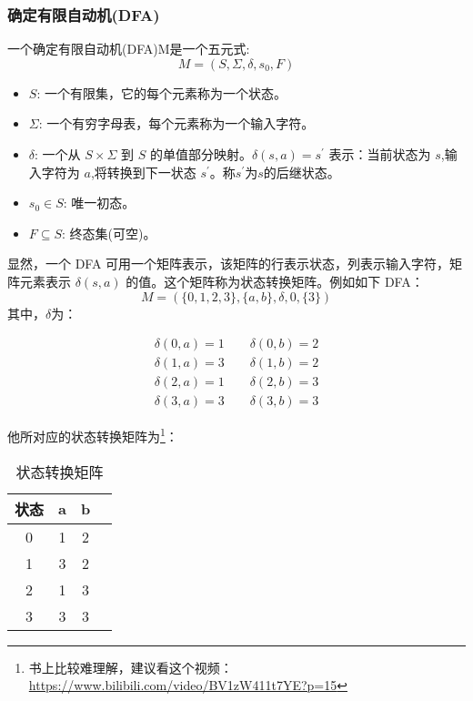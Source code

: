 \subsubsection{\textcolor{imp}{确定有限自动机(DFA)}}

一个确定有限自动机(DFA)M是一个五元式:
\[ M = (S,\Sigma,\delta,s_0,F) \]

\begin{itemize}
    \item $S$: 一个有限集，它的每个元素称为一个状态。
    \item $\Sigma$: 一个有穷字母表，每个元素称为一个输入字符。
    \item $\delta$: 一个从 $S \times \Sigma$ 到 $S$ 的单值部分映射。$\delta(s,a)=s^{'}$ 表示：当前状态为 $s$,输入字符为 $a$,将转换到下一状态 $s^{'}$。称$s^{'}$为$s$的后继状态。
    \item $s_0\in S$: 唯一初态。
    \item $F\subseteq S$: 终态集(可空)。
\end{itemize}

显然，一个 DFA 可用一个矩阵表示，该矩阵的行表示状态，列表示输入字符，矩阵元素表示 $\delta(s,a)$ 的值。这个矩阵称为状态转换矩阵。例如如下 DFA：
\[ M = (\{0,1,2,3\},\{a,b\},\delta,0,\{3\}) \]
其中，$\delta$为：

\begin{equation}
    \begin{aligned}
        \delta(0,a) = 1 \qquad \delta(0,b) = 2 \\ 
        \delta(1,a) = 3 \qquad \delta(1,b) = 2 \\ 
        \delta(2,a) = 1 \qquad \delta(2,b) = 3 \\ 
        \delta(3,a) = 3 \qquad \delta(3,b) = 3 \nonumber
    \end{aligned}
\end{equation}

他所对应的状态转换矩阵为\footnote{书上比较难理解，建议看这个视频：\url{https://www.bilibili.com/video/BV1zW411t7YE?p=15}}：
\begin{table}[H]
    \centering
    \caption{状态转换矩阵}
    \label{table:状态转换矩阵}
    \setlength{\tabcolsep}{15mm}
    \begin{tabular}{c|ccc}
        \toprule
        \textbf{状态} & \textbf{a} & \textbf{b}\\
        \midrule
        0 & 1 & 2 \\
        1 & 3 & 2 \\
        2 & 1 & 3 \\
        3 & 3 & 3 \\
        \bottomrule
    \end{tabular}
\end{table}

